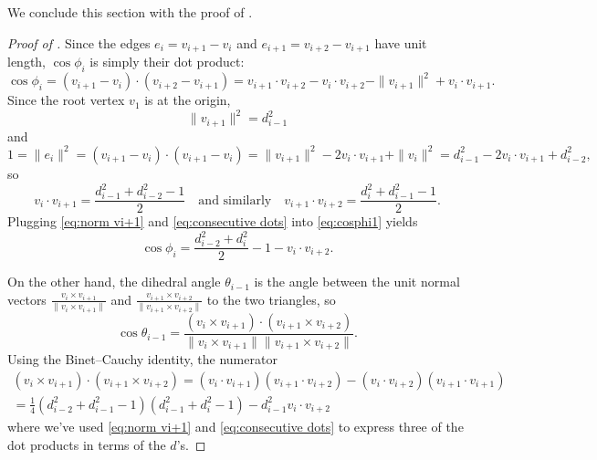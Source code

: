 \documentclass{article}
\theoremstyle{definition}
\begin{document}
	We conclude this section with the proof of .
	
	\begin{proof}[{Proof of }]
	Since the edges $e_i = v_{i+1}-v_i$ and $e_{i+1} = v_{i+2}-v_{i+1}$ have unit length, $\cos \phi_i$ is simply their dot product:
	\begin{equation}\label{eq:cosphi1}
		\cos\phi_i = (v_{i+1}-v_i) \cdot (v_{i+2}-v_{i+1}) = v_{i+1} \cdot v_{i+2} - v_i \cdot v_{i+2} - \|v_{i+1}\|^2 + v_i \cdot v_{i+1}.
	\end{equation}
	Since the root vertex $v_1$ is at the origin, 
	\begin{equation}\label{eq:norm vi+1}
		\|v_{i+1}\|^2 = d_{i-1}^2
	\end{equation} 
	and 
	\[
		1 = \|e_i\|^2 = (v_{i+1} - v_i) \cdot (v_{i+1} - v_i) = \|v_{i+1}\|^2 - 2 v_i \cdot v_{i+1} + \|v_i\|^2 = d_{i-1}^2 - 2 v_i \cdot v_{i+1} + d_{i-2}^2,
	\]
	so 
	\begin{equation}\label{eq:consecutive dots}
		v_i \cdot v_{i+1} = \frac{d_{i-1}^2 + d_{i-2}^2 - 1}{2} \quad \text{and similarly} \quad v_{i+1} \cdot v_{i+2} = \frac{d_{i}^2 + d_{i-1}^2 - 1}{2}.
	\end{equation}
	Plugging \eqref{eq:norm vi+1} and \eqref{eq:consecutive dots} into \eqref{eq:cosphi1} yields
	\begin{equation}\label{eq:cosphi}
		\cos \phi_i = \frac{d_{i-2}^2 + d_i^2}{2} - 1 - v_i \cdot v_{i+2}.
	\end{equation}
	
	On the other hand, the dihedral angle $\theta_{i-1}$ is the angle between the unit normal vectors $\frac{v_i \times v_{i+1}}{\|v_i \times v_{i+1}\|}$ and $\frac{v_{i+1} \times v_{i+2}}{\|v_{i+1} \times v_{i+2}\|}$ to the two triangles, so
	\begin{equation}\label{eq:costheta1}
		\cos\theta_{i-1} = \frac{(v_i \times v_{i+1})\cdot(v_{i+1} \times v_{i+2})}{\|v_i \times v_{i+1}\|\|v_{i+1} \times v_{i+2}\|}.
	\end{equation}
	Using the Binet–Cauchy identity, the numerator 
	\begin{multline}\label{eq:quadruple product}
		(v_i \times v_{i+1})\cdot(v_{i+1} \times v_{i+2}) = (v_i \cdot v_{i+1})(v_{i+1} \cdot v_{i+2}) - (v_i \cdot v_{i+2})(v_{i+1} \cdot v_{i+1}) \\
		= \frac{1}{4}(d_{i-2}^2 + d_{i-1}^2 - 1)(d_{i-1}^2 + d_{i}^2 - 1) - d_{i-1}^2 v_i \cdot v_{i+2}
	\end{multline}
	where we've used \eqref{eq:norm vi+1} and \eqref{eq:consecutive dots} to express three of the dot products in terms of the $d$'s.
	

\end{proof}
\end{document}
